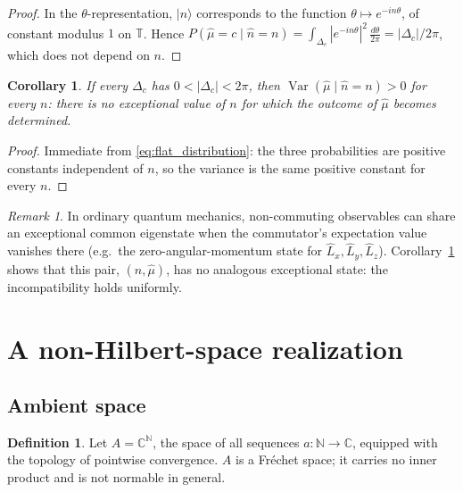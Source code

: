 \documentclass[11pt]{amsart}
\numberwithin{equation}{section}
\theoremstyle{plain}
\newtheorem{corollary}[theorem]{Corollary}
\theoremstyle{definition}
\newtheorem{definition}[theorem]{Definition}
\theoremstyle{remark}
\newtheorem{remark}[theorem]{Remark}
\newcommand{\N}{\mathbb{N}}
\newcommand{\C}{\mathbb{C}}
\begin{document}
\begin{proof}
In the $\theta$-representation, $|n\rangle$ corresponds to the function
$\theta\mapsto e^{-in\theta}$, of constant modulus $1$ on $\mathbb{T}$.
Hence $P(\hat\mu=c\mid \hat n=n)=\int_{\Delta_c}|e^{-in\theta}|^2\,\frac{d\theta}{2\pi}
= |\Delta_c|/2\pi$, which does not depend on $n$.
\end{proof}

\begin{corollary}
\label{cor:no_exceptional_state}
If every $\Delta_c$ has $0<|\Delta_c|<2\pi$, then
$\operatorname{Var}(\hat\mu\mid \hat n=n)>0$ for every $n$: there is no
exceptional value of $n$ for which the outcome of $\hat\mu$ becomes
determined.
\end{corollary}

\begin{proof}
Immediate from \eqref{eq:flat_distribution}: the three probabilities
are positive constants independent of $n$, so the variance is the same
positive constant for every $n$.
\end{proof}

\begin{remark}
\label{rem:no_vacuum_analogue}
In ordinary quantum mechanics, non-commuting observables can share an
exceptional common eigenstate when the commutator's expectation value
vanishes there (e.g.\ the zero-angular-momentum state for
$\hat L_x,\hat L_y,\hat L_z$). Corollary~\ref{cor:no_exceptional_state}
shows that this pair, $(\hat n,\hat\mu)$, has no analogous exceptional
state: the incompatibility holds uniformly.
\end{remark}

\section{A non-Hilbert-space realization}
\label{sec:non_hilbert}

\subsection{Ambient space}
\label{subsec:non_hilbert_ambient}

\begin{definition}
\label{def:arithmetic_sequence_space}
Let $A=\C^\N$, the space of all sequences $a:\N\to\C$, equipped with
the topology of pointwise convergence. $A$ is a Fr\'echet space; it
carries no inner product and is not normable in general.
\end{definition}
\end{document}
